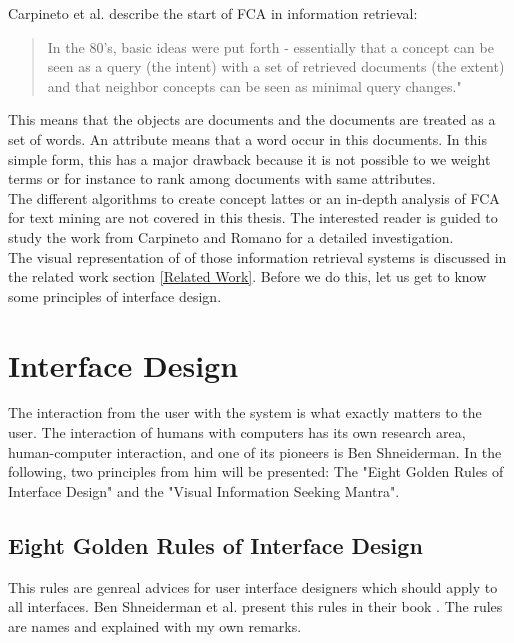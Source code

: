 \documentclass[11pt]{report}
\begin{document}
Carpineto et al.\cite{Carpineto2005} describe the start of FCA in information retrieval:

\begin{quote}
In the 80's, basic ideas were put forth - essentially that a concept can be seen as a query (the intent) with a set of retrieved documents (the extent) and that neighbor concepts can be seen as minimal query changes."
\end{quote}

This means that the objects are documents and the documents are treated as a set of words. An attribute means that a word occur in this documents. In this simple form, this has a major drawback because it is not possible to we weight terms or for instance to rank among documents with same attributes.\\

The different algorithms to create concept lattes or an in-depth analysis of FCA for text mining are not covered in this thesis. The interested reader is guided to study the work from Carpineto and Romano \cite{carpineto2004concept} for a detailed investigation. \\

The visual representation of of those information retrieval systems is discussed in the related work section \ref{Related Work}. Before we do this, let us get to know some principles of interface design. \\

\section{Interface Design}
\label{id}

The interaction from the user with the system is what exactly matters to the user. The interaction of humans with computers has its own research area, human-computer interaction, and one of its pioneers is Ben Shneiderman. In the following, two principles from him will be presented: The "Eight Golden Rules of Interface Design" and the "Visual Information Seeking Mantra".

\subsection{Eight Golden Rules of Interface Design}

This rules are genreal advices for user interface designers which should apply to all interfaces. Ben Shneiderman et al. present this rules in their book \cite{Shneiderman2010}. The rules are names and explained with my own remarks. \\
\end{document}
